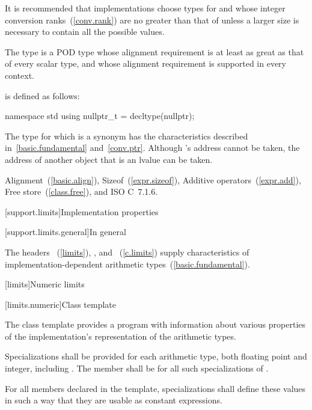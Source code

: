 \pnum
\enternote
It is recommended that implementations choose types for  and 
whose integer conversion ranks~(\ref{conv.rank}) are no greater than that of
 unless a larger size is necessary to contain all the possible values.
\exitnote

\pnum
The type
%
 is a POD type whose alignment requirement
is at least as great as that of every scalar type, and whose alignment
requirement is supported in every context.

\pnum
{}%
 is defined as follows:

\begin{codeblock}
namespace std {
  using nullptr_t = decltype(nullptr);
}
\end{codeblock}

The type for which  is a synonym has the characteristics
described in~\ref{basic.fundamental} and~\ref{conv.ptr}. \enternote Although
's address cannot be taken, the address of another
 object that is an lvalue can be taken. \exitnote

\xref Alignment~(\ref{basic.align}), Sizeof~(\ref{expr.sizeof}), Additive
operators~(\ref{expr.add}), Free store~(\ref{class.free}), and ISO C~7.1.6.

[support.limits]{Implementation properties}

[support.limits.general]{In general}

\pnum
The headers
~(\ref{limits}),
, and
~(\ref{c.limits})
supply characteristics of implementation-dependent
arithmetic types~(\ref{basic.fundamental}).

[limits]{Numeric limits}

[limits.numeric]{Class template }

\pnum
The
%
class template provides a \Cpp program with information about various properties of
the implementation's representation of the
arithmetic types.

\pnum
Specializations shall be provided for each
arithmetic type,
both floating point and integer, including
.
The member
shall be
for all such specializations of
.

\pnum
For all members declared
 
in the
template, specializations shall define these values in such a way
that they are usable as
constant expressions.

